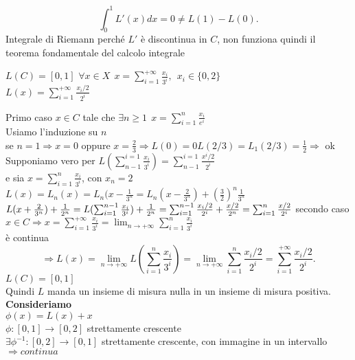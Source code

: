 \documentclass[12px]{article}
\begin{document}
  \[
  \int_0^1 L'(x) dx = 0 \neq L(1) - L(0)
  .\] 
  Integrale di Riemann perché $L'$ è discontinua in $C$, non funziona quindi il teorema fondamentale del calcolo integrale 
  \begin{prop}
	  $L(C) = [0,1]$ $\forall x\in X \ \  x = \sum^{+\infty}_{i = 1} \frac{x_i}{3^i}, \ \ x_i\in \{0,2\}$\\
	  $L(x) = \sum^{+\infty}_{i=1}\frac{x_i/2}{2^i}$
  \end{prop}
  \begin{dimo}
	  Primo caso $x\in C$ tale che $\exists n\geq 1 \ \ x = \sum^{n}_{i = 1}\frac { x_i} {e^i}$\\
	  Usiamo l'induzione su $n$ \\
	  se $n = 1 \Rightarrow x = 0$ oppure $x = \frac 23 \Rightarrow L(0) = 0 L(2/3) = L_1(2/3) = \frac 12 \Rightarrow  $ ok\\
	  Supponiamo vero per $L( \sum^{i = 1}_{n-1}\frac { x_i}{3^i} )= \sum^{i = 1}_{n-1}\frac{x^i/2}{2^i}$\\
	  e sia $x = \sum^{n}_{i=1}\frac{x_i}{3^i}$, con $x_n = 2$\\
	  $L(x) = L_n(x) = L_n(x - \frac 1 {3^n} = L_n(x-\frac {2}{3^n}) + (\frac 32)^n\frac{1}{3^n}$  \\
	  $L(x + \frac {2}{3^n}) + \frac 1 {2^n} = L( \sum^{n-1}_{i = 1}\frac{x_i}{3^i}) + \frac 1  {2^n} = \sum^{n-1}_{i=1}\frac{x_i/2}{2^i} + \frac{x/2}{2^n} = \sum^{n}_{i=1}\frac{x/2}{2^i}\\$
	  secondo caso\\
	  $x\in C \Rightarrow x = \sum^{+\infty}_{i = 1}\frac{x_i}{3^i} = \lim_{n \rightarrow+\infty} \sum^{n}_{i = 1}\frac { x_i}{3^i}$\\
	  è continua\\
	  \[
		  \Rightarrow L(x) = \lim_{n \rightarrow +\infty} L( \sum^{n}_{i=1}\frac { x_i}{3^i}) = \lim_{n \rightarrow +\infty} \sum^{n}_{i= 1}\frac { x_i/2}{2^i} = \sum^{+\infty}_{i = 1}\frac{x_i/2}{2^i}
	  .\] 
	  $L(C)  = [0,1]$\\
	  Quindi  $L$ manda un insieme di misura nulla in un insieme di misura positiva.\\
	  \textbf{Consideriamo}\\
	  $ \phi(x) = L(x) + x$\\
	  $\phi: [0,1] \rightarrow [0,2]$ strettamente crescente\\
	  $\exists \phi^{-1}:[0,2] \rightarrow[0,1]$
	  strettamente crescente, con immagine in un intervallo $ \Rightarrow  continua$ \\

\end{dimo}
\end{document}
